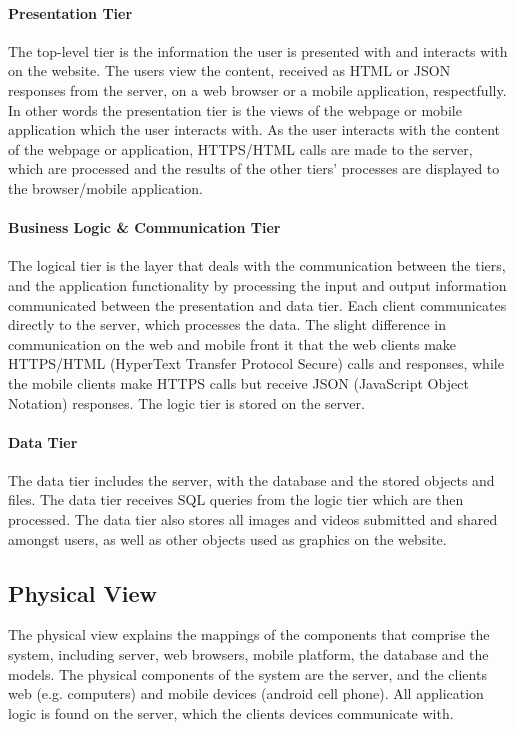 \documentclass[11pt]{report}
\begin{document}
\paragraph{Presentation Tier}
The top-level tier is the information the user is presented with and interacts with on the website. The users view the content, received as HTML or JSON responses from the server, on a web browser or a mobile application, respectfully.  In other words the presentation tier is the views of the webpage or mobile application which the user interacts with. As the user interacts with the content of the webpage or application, HTTPS/HTML calls are made to the server, which are processed and the results of the other tiers' processes are displayed to the browser/mobile application. 

\paragraph{Business Logic \& Communication Tier}
The logical tier is the layer that deals with the communication between the tiers, and the application functionality by processing the input and output information communicated between the presentation and data tier. Each client communicates directly to the server, which processes the data. The slight difference in communication on the web and mobile front it that the web clients make HTTPS/HTML (HyperText Transfer Protocol Secure) calls and responses, while the mobile clients make HTTPS calls but receive JSON (JavaScript Object Notation) responses. The logic tier is stored on the server. 

\paragraph{Data Tier}
The data tier includes the server, with the database and the stored objects and files. The data tier receives SQL queries from the logic tier which are then processed. The data tier also stores all images and videos submitted and shared amongst users, as well as other objects used as graphics on the website. 

\newpage
\subsection{Physical View}
The physical view explains the mappings of the components that comprise the system, including server, web browsers, mobile platform, the database and the models. The physical components of the system are the server, and the clients web (e.g. computers) and mobile devices (android cell phone). All application logic is found on the server, which the clients devices communicate with. 
\end{document}

